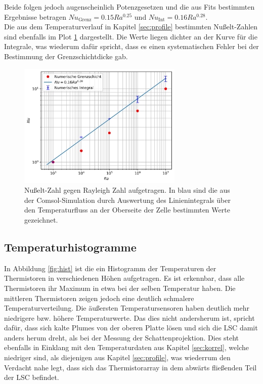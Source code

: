 \documentclass[12pt,a4paper,titlepage,headinclude]{scrartcl}
\numberwithin{equation}{subsection}
\begin{document}
Beide folgen jedoch augenscheinlich Potenzgesetzen und die aus Fits bestimmten Ergebnisse betragen $Nu_\text{Grenz}=0.15Ra^{0.25}$ und $Nu_\text{Int}=0.16Ra^{0.28}$.\\

Die aus dem Temperaturverlauf in Kapitel \ref{sec:profile} bestimmten Nußelt-Zahlen sind ebenfalls im Plot \ref{fig:Nu_Ra} dargestellt.
Die Werte liegen dichter an der Kurve für die Integrale, was wiederum dafür spricht, dass es einen systematischen Fehler bei der Bestimmung der Grenzschichtdicke gab.



\begin{figure}[!ht]
\centering
\includegraphics[width=0.7\textwidth]{Nu_Ra}
\caption{Nußelt-Zahl gegen Rayleigh Zahl aufgetragen. In blau sind die aus der Comsol-Simulation durch Auswertung des Linienintegrals über den Temperaturfluss an der Oberseite der Zelle bestimmten Werte gezeichnet. }
\label{fig:Nu_Ra}
\end{figure}






\subsection{Temperaturhistogramme}
In Abbildung \ref{fig:hist} ist die ein Histogramm der Temperaturen der Thermistoren in verschiedenen Höhen aufgetragen.
Es ist erkennbar, dass alle Thermistoren ihr Maximum in etwa bei der selben Temperatur haben.
Die mittleren Thermistoren zeigen jedoch eine deutlich schmalere Temperaturverteilung.
Die äußersten Temperatursensoren haben deutlich mehr niedrigere bzw. höhere Temperaturwerte.
Das dies nicht andersherum ist, spricht dafür, dass sich kalte Plumes von der oberen Platte lösen und sich die LSC damit anders herum dreht, als bei der Messung der Schattenprojektion.
Dies steht ebenfalls in Einklang mit den Temperaturdaten aus Kapitel \ref{sec:korrel}, welche niedriger sind, als diejenigen aus Kapitel \ref{sec:profile}, was wiederrum den Verdacht nahe legt, dass sich das Thermistorarray in dem abwärts fließenden Teil der LSC befindet.
\end{document}
